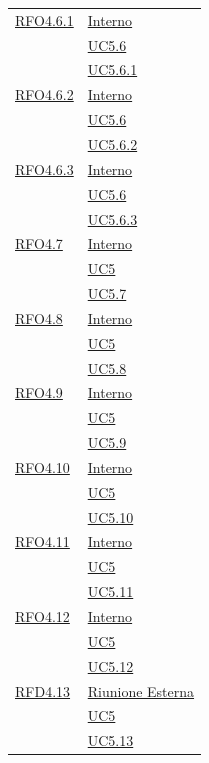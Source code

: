 \begin{longtable}{|>{\centering}m{5cm}|m{5cm}<{\centering}|}
\hyperlink{RFO4.6.1}{RFO4.6.1} & \hyperlink{Interno}{Interno}\\
& \hyperref[UC5.6]{UC5.6}\\
& \hyperref[UC5.6.1]{UC5.6.1}\\ \hline

\hyperlink{RFO4.6.2}{RFO4.6.2} & \hyperlink{Interno}{Interno}\\
& \hyperref[UC5.6]{UC5.6}\\
& \hyperref[UC5.6.2]{UC5.6.2}\\ \hline

\hyperlink{RFO4.6.3}{RFO4.6.3} & \hyperlink{Interno}{Interno}\\
& \hyperref[UC5.6]{UC5.6}\\
& \hyperref[UC5.6.3]{UC5.6.3}\\ \hline

\hyperlink{RFO4.7}{RFO4.7} & \hyperlink{Interno}{Interno}\\
& \hyperref[UC5]{UC5}\\
& \hyperref[UC5.7]{UC5.7}\\ \hline

\hyperlink{RFO4.8}{RFO4.8} & \hyperlink{Interno}{Interno}\\
& \hyperref[UC5]{UC5}\\
& \hyperref[UC5.8]{UC5.8}\\ \hline

\hyperlink{RFO4.9}{RFO4.9} & \hyperlink{Interno}{Interno}\\
& \hyperref[UC5]{UC5}\\
& \hyperref[UC5.9]{UC5.9}\\ \hline

\hyperlink{RFO4.10}{RFO4.10} & \hyperlink{Interno}{Interno}\\
& \hyperref[UC5]{UC5}\\
& \hyperref[UC5.10]{UC5.10}\\ \hline

\hyperlink{RFO4.11}{RFO4.11} & \hyperlink{Interno}{Interno}\\
& \hyperref[UC5]{UC5}\\
& \hyperref[UC5.11]{UC5.11}\\ \hline

\hyperlink{RFO4.12}{RFO4.12} & \hyperlink{Interno}{Interno}\\
& \hyperref[UC5]{UC5}\\
& \hyperref[UC5.12]{UC5.12}\\ \hline

\hyperlink{RFD4.13}{RFD4.13} & \hyperlink{Riunione Esterna}{Riunione Esterna}\\
& \hyperref[UC5]{UC5}\\
& \hyperref[UC5.13]{UC5.13}\\ \hline


\end{longtable}
